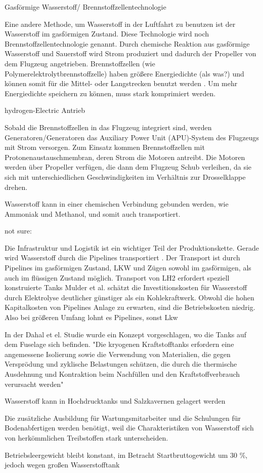 Gasförmige Wasserstoff/ Brennstoffzellentechnologie

Eine andere Methode, um Wasserstoff in der Luftfahrt zu benutzen ist der Wasserstoff im gasförmigen Zustand. 
Diese Technologie wird noch Brennstoffzellentechnologie genannt.
Durch chemische Reaktion aus gasförmige Wasserstoff  und Sauerstoff  wird Strom produziert \cite{dalmia2022powering} und 
dadurch der Propeller von dem Flugzeug angetrieben.
Brennstoffzellen (wie Polymerelektrolytbrennstoffzelle) haben größere Energiedichte (als was?) und 
können somit für die Mittel- oder Langstrecken benutzt werden \cite{dalmia2022powering}. 
Um mehr Energiedichte speichern zu können, muss  stark komprimiert werden.

hydrogen-Electric Antrieb

Sobald die Brennstoffzellen in das Flugzeug integriert sind, werden Generatoren/Generatoren das 
Auxiliary Power Unit (APU)-System des Flugzeugs mit Strom versorgen. Zum Einsatz kommen Brennstoffzellen 
mit Protonenaustauschmembran, deren Strom die Motoren antreibt. Die Motoren werden über Propeller verfügen,
die dann dem Flugzeug Schub verleihen, da sie sich mit unterschiedlichen Geschwindigkeiten im Verhältnis zur Drosselklappe drehen.\cite{dalmia2022powering}

Wasserstoff kann in einer chemischen Verbindung gebunden werden, wie Ammoniak und Methanol, und somit auch transportiert.

not sure:

Die Infrastruktur und Logistik ist ein wichtiger Teil der Produktionskette. Gerade wird Wasserstoff durch die Pipelines 
transportiert \cite{mulder2019outlook}. Der Transport ist durch Pipelines im gasförmigen Zustand, LKW und Zügen sowohl im gasförmigen,
als auch im flüssigen Zustand möglich. 
Transport von LH2 erfordert speziell konstruierte Tanks \cite{mulder2019outlook}
Mulder et al. schätzt die Investitionskosten für Wasserstoff durch Elektrolyse deutlicher günstiger als ein Kohlekraftwerk. 
Obwohl die hohen Kapitalkosten von Pipelines Anlage zu erwarten, sind die Betriebskosten niedrig. Also bei größeren Umfang lohnt es Pipelines, sonst Lkw


\cite{dahal2021techno} In der Dahal et el. Studie wurde ein Konzept vorgeschlagen, wo die Tanks auf dem Fuselage sich befinden.
"Die kryogenen Kraftstofftanks erfordern eine angemessene Isolierung sowie die Verwendung von Materialien, die 
gegen Versprödung und zyklische Belastungen schützen, die durch die thermische Ausdehnung und Kontraktion beim Nachfüllen 
und den Kraftstoffverbrauch verursacht werden"

Wasserstoff kann in Hochdrucktanks und Salzkavernen gelagert werden \cite{mulder2019outlook}

Die zusätzliche Ausbildung für Wartungsmitarbeiter und die Schulungen für Bodenabfertigen
werden benötigt, weil die Charakteristiken von Wasserstoff 
sich von herkömmlichen Treibstoffen stark unterscheiden.

Betriebsleergewicht bleibt konstant, im Betracht Startbruttogewicht um 30 \%, jedoch wegen großen Wasserstofftank

